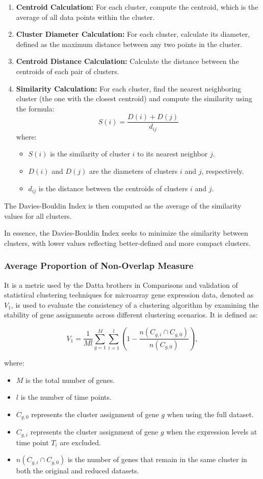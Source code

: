 \documentclass{llncs}
\begin{document}
\begin{enumerate}
	\item \textbf{Centroid Calculation:} For each cluster, compute the centroid, which is the average of all data points within the cluster.
	\item \textbf{Cluster Diameter Calculation:} For each cluster, calculate its diameter, defined as the maximum distance between any two points in the cluster.
	\item \textbf{Centroid Distance Calculation:} Calculate the distance between the centroids of each pair of clusters.
	\item \textbf{Similarity Calculation:} For each cluster, find the nearest neighboring cluster (the one with the closest centroid) and compute the similarity using the formula:
	\[
	S(i) = \frac{D(i) + D(j)}{d_{ij}}
	\]
	where:
	\begin{itemize}
		\item $S(i)$ is the similarity of cluster $i$ to its nearest neighbor $j$.
		\item $D(i)$ and $D(j)$ are the diameters of clusters $i$ and $j$, respectively.
		\item $d_{ij}$ is the distance between the centroids of clusters $i$ and $j$.
	\end{itemize}
\end{enumerate}

The Davies-Bouldin Index is then computed as the average of the similarity values for all clusters.\cite{Davies1979Cluster}

In essence, the Davies-Bouldin Index seeks to minimize the similarity between clusters, with lower values reflecting better-defined and more compact clusters.

\subsubsection{Average Proportion of Non-Overlap Measure} It is a metric used by the Datta brothers in Comparisons and validation of statistical clustering techniques for microarray gene expression data\cite{datta2003}, denoted as $V_1$, is used to evaluate the consistency of a clustering algorithm by examining the stability of gene assignments across different clustering scenarios. It is defined as:

\[
V_1 = \frac{1}{M l} \sum_{g=1}^{M} \sum_{i=1}^{l} \left( 1 - \frac{n(C_{g,i} \cap C_{g,0})}{n(C_{g,0})} \right),
\]

where:
\begin{itemize}
	\item $M$ is the total number of genes.
	\item $l$ is the number of time points.
	\item $C_{g,0}$ represents the cluster assignment of gene $g$ when using the full dataset.
	\item $C_{g,i}$ represents the cluster assignment of gene $g$ when the expression levels at time point $T_i$ are excluded.
	\item $n(C_{g,i} \cap C_{g,0})$ is the number of genes that remain in the same cluster in both the original and reduced datasets.
\end{itemize}
\end{document}

